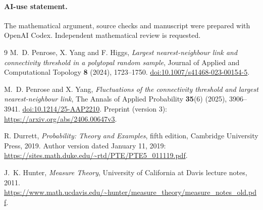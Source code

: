 \documentclass[11pt]{article}
\begin{document}
\paragraph{AI-use statement.}
The mathematical argument, source checks and manuscript were prepared with
OpenAI Codex. Independent mathematical review is requested.

\begin{thebibliography}{9}
M.~D. Penrose, X. Yang and F. Higgs,
\emph{Largest nearest-neighbour link and connectivity threshold in a polytopal
random sample}, Journal of Applied and Computational Topology \textbf{8}
(2024), 1723--1750.
\href{https://doi.org/10.1007/s41468-023-00154-5}{doi:10.1007/s41468-023-00154-5}.

M.~D. Penrose and X. Yang,
\emph{Fluctuations of the connectivity threshold and largest nearest-neighbour
link}, The Annals of Applied Probability \textbf{35}(6) (2025), 3906--3941.
\href{https://doi.org/10.1214/25-AAP2210}{doi:10.1214/25-AAP2210}.
Preprint (version 3): \url{https://arxiv.org/abs/2406.00647v3}.

R. Durrett, \emph{Probability: Theory and Examples}, fifth edition,
Cambridge University Press, 2019. Author version dated January 11, 2019:
\url{https://sites.math.duke.edu/~rtd/PTE/PTE5_011119.pdf}.

J.~K. Hunter, \emph{Measure Theory}, University of California at Davis
lecture notes, 2011.
\url{https://www.math.ucdavis.edu/~hunter/measure_theory/measure_notes_old.pdf}.
\end{thebibliography}
\end{document}
